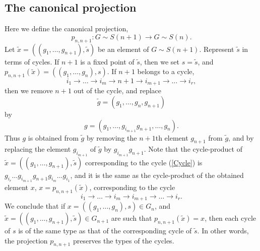 \documentclass[12pt]{amsart}
\theoremstyle{definition}
\numberwithin{equation}{section}
\begin{document}
\subsection{The canonical projection}\label{SectionProjection}
Here we define the canonical projection,
$$
p_{n,n+1}: G\sim S(n+1)\longrightarrow G\sim S(n).
$$
Let $\tilde{x}=\left(\left(g_1,\ldots,g_{n+1}\right),\tilde{s}\right)$ be an element of $G\sim S(n+1)$.
Represent $\tilde{s}$ in terms of cycles. If $n+1$ is a fixed point of $\tilde{s}$, then we set
$s=\tilde{s}$, and $p_{n,n+1}\left(\tilde{x}\right)=\left(\left(g_1,\ldots,g_{n}\right), s\right)$.
If $n+1$ belongs to a cycle,
\begin{equation}\label{Cycle}
i_1\rightarrow\ldots\rightarrow i_m\rightarrow n+1\rightarrow i_{m+1}\rightarrow\ldots\rightarrow i_r,
\end{equation}
then we remove $n+1$ out of the cycle, and replace
$$
\tilde{g}=\left(g_1,\ldots,g_n,g_{n+1}\right)
$$
by
$$
g=\left(g_1,\ldots, g_{i_{m+1}}g_{n+1},\ldots,g_n\right).
$$
Thus $g$ is obtained from $\tilde{g}$ by  removing the $n+1$th element $g_{n+1}$ from $\tilde{g}$, and by
replacing the element $g_{i_{m+1}}$ of $\tilde{g}$ by $g_{i_{m+1}}g_{n+1}$. Note that the cycle-product of $\tilde{x}=\left(\left(g_1,\ldots,g_{n+1}\right),\tilde{s}\right)$ corresponding to the cycle (\ref{Cycle})
is $g_{i_r}\ldots g_{i_{m+1}}g_{n+1}g_{i_m}\ldots g_{i_1}$, and it is  the same as the cycle-product of the obtained element  $x$, $x=p_{n,n+1}\left(\tilde{x}\right)$, corresponding to the cycle
$$
i_1\rightarrow\ldots\rightarrow i_m\rightarrow i_{m+1}\rightarrow\ldots\rightarrow i_r.
$$
We conclude that if $x=\left(\left(g_1,\ldots,g_n\right),s\right)\in G_n$, and
$\tilde{x}=\left(\left(g_1,\ldots,g_{n+1}\right),\tilde{s}\right)\in G_{n+1}$ are such that $p_{n,n+1}(\tilde{x})=x$, then each cycle of $s$ is of the same type as that
of the corresponding cycle of $\tilde{s}$. In other words, the projection $p_{n,n+1}$ preserves the types of the cycles.
\end{document}
